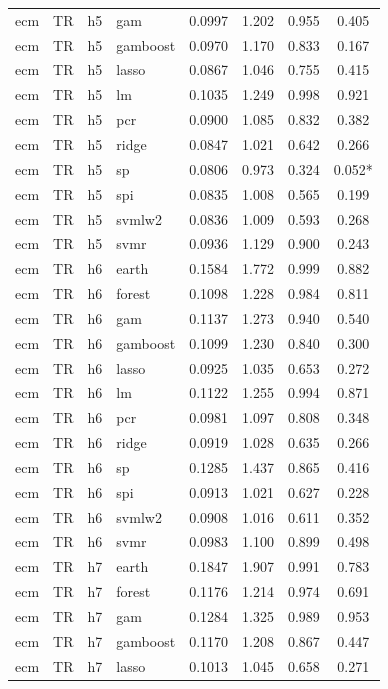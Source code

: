 \begin{ThreePartTable}
\begin{longtable}[t]{llclcccc}
ecm & TR & h5 & gam & 0.0997 & 1.202 & 0.955 & 0.405\\
ecm & TR & h5 & gamboost & 0.0970 & 1.170 & 0.833 & 0.167\\
ecm & TR & h5 & lasso & 0.0867 & 1.046 & 0.755 & 0.415\\
ecm & TR & h5 & lm & 0.1035 & 1.249 & 0.998 & 0.921\\
ecm & TR & h5 & pcr & 0.0900 & 1.085 & 0.832 & 0.382\\
ecm & TR & h5 & ridge & 0.0847 & 1.021 & 0.642 & 0.266\\
ecm & TR & h5 & sp & 0.0806 & 0.973 & 0.324 & 0.052*\\
ecm & TR & h5 & spi & 0.0835 & 1.008 & 0.565 & 0.199\\
ecm & TR & h5 & svmlw2 & 0.0836 & 1.009 & 0.593 & 0.268\\
ecm & TR & h5 & svmr & 0.0936 & 1.129 & 0.900 & 0.243\\
\addlinespace
ecm & TR & h6 & earth & 0.1584 & 1.772 & 0.999 & 0.882\\
ecm & TR & h6 & forest & 0.1098 & 1.228 & 0.984 & 0.811\\
ecm & TR & h6 & gam & 0.1137 & 1.273 & 0.940 & 0.540\\
ecm & TR & h6 & gamboost & 0.1099 & 1.230 & 0.840 & 0.300\\
ecm & TR & h6 & lasso & 0.0925 & 1.035 & 0.653 & 0.272\\
ecm & TR & h6 & lm & 0.1122 & 1.255 & 0.994 & 0.871\\
ecm & TR & h6 & pcr & 0.0981 & 1.097 & 0.808 & 0.348\\
ecm & TR & h6 & ridge & 0.0919 & 1.028 & 0.635 & 0.266\\
ecm & TR & h6 & sp & 0.1285 & 1.437 & 0.865 & 0.416\\
ecm & TR & h6 & spi & 0.0913 & 1.021 & 0.627 & 0.228\\
ecm & TR & h6 & svmlw2 & 0.0908 & 1.016 & 0.611 & 0.352\\
ecm & TR & h6 & svmr & 0.0983 & 1.100 & 0.899 & 0.498\\
\addlinespace
ecm & TR & h7 & earth & 0.1847 & 1.907 & 0.991 & 0.783\\
ecm & TR & h7 & forest & 0.1176 & 1.214 & 0.974 & 0.691\\
ecm & TR & h7 & gam & 0.1284 & 1.325 & 0.989 & 0.953\\
ecm & TR & h7 & gamboost & 0.1170 & 1.208 & 0.867 & 0.447\\
ecm & TR & h7 & lasso & 0.1013 & 1.045 & 0.658 & 0.271\\

\end{longtable}
\end{ThreePartTable}
